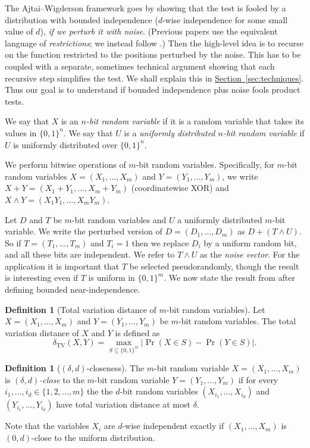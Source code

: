 \documentclass[11pt]{article}
\numberwithin{equation}{section}
\theoremstyle{definition}
\newtheorem{definition}[theorem]{Definition}
\theoremstyle{plain}
\newcommand{\expref}[2]{\hyperref[#2]{#1~\ref{#2}}}
\newcommand{\zo}{\{0,1\}}
\DeclareMathOperator*{\TV}{TV}     %
\begin{document}
The Ajtai--Wigderson framework goes by showing that the test is fooled by
a distribution with 
%
bounded  %
%
%
%
%
independence \cite{NaorN93}
%
($d$-wise independence for some small value of $d$),   %
\emph{if we perturb it with noise}.
%
%
%
%
%
%
%
%
%
%
%
%
%
%
(Previous papers use the equivalent language of
\emph{restrictions}; %
we instead follow \cite{HaramatyLV-bipnfp}.)  Then the
high-level idea is to recurse on the
function restricted to the  %
positions perturbed by the  %
noise.
%
%
%
This has to be coupled with a
separate, sometimes technical argument showing that each
%
recursive step  %
%
simplifies the test. %
%
%
%
We shall explain this
in \expref{Section}{sec:techniques}.  %
Thus our goal is to understand if bounded independence plus noise
%
%
fools product tests.
%
%
%
%
%
%
%
%
%

We say that $X$ is an \emph{$n$-bit random variable} if it is a
random variable that takes its values in $\zo^n$.
We say that $U$ is a \emph{uniformly distributed $n$-bit
random variable} if $U$ is uniformly distributed over $\zo^n$.

%
%
We perform bitwise operations of $m$-bit random variables.
Specifically, for $m$-bit random variables $X=(X_1,\dots,X_m)$ and
$Y=(Y_1,\dots,Y_m)$, we write $X+Y=(X_1+Y_1,\dots,X_m+Y_m)$
(coordinatewise XOR) and $X\wedge Y=(X_1Y_1,\dots,X_mY_m)$.
%
%
%
%

Let $D$ and $T$ be $m$-bit random variables and $U$ a uniformly
distributed $m$-bit variable.  We write the perturbed version
of $D=(D_1,\dots,D_m)$ as $D+(T\wedge U)$.  So if $T=(T_1,\dots,T_m)$
and $T_i=1$ then we replace $D_i$ by a uniform random bit,
and all these bits are independent.  %
We refer to $T\wedge U$ as the \emph{noise vector}.
%
%
%
For the application it is important that $T$
%
be  %
selected pseudorandomly,
though the result is interesting even if $T$ is uniform in $\zo^m$.
We now state the result
%
from  %
\cite{HaramatyLV-bipnfp} after defining 
bounded near-independence.

%
%
%
%
%
%
\begin{definition}[Total variation distance of $m$-bit random variables]
Let $X=(X_1,\ldots,X_m)$ and $Y=(Y_1,\ldots,Y_m)$ be
$m$-bit random variables.  The total variation distance
of $X$ and $Y$ is defined as
\[ \delta_{\TV}(X,Y)= \max_{S\subseteq \zo^m} |\Pr(X\in S) - \Pr(Y\in S)| . \]
%
%
\end{definition}

%
%
\begin{definition}[$(\delta, d)$-closeness] \label{def-almost-independent}
The $m$-bit random variable $X=(X_1, \ldots, X_m)$ is
\emph{$(\delta,d)$-close} to
the $m$-bit random variable %
$Y=(Y_1, \ldots, Y_m)$
%
%
%
%
%
if for every $i_1, \ldots, i_d \in  \{ 1, 2, \ldots, m \}$ the
%
the $d$-bit random variables
$(X_{i_1}, \ldots, X_{i_d})$ and $(Y_{i_1}, \ldots, Y_{i_d})$ have
total variation distance at most $\delta$.
\end{definition}
%
%
%
%
Note that the variables $X_i$ are $d$-wise independent
exactly if $(X_1,\dots,X_m)$ is $(0,d)$-close to the uniform
distribution.
\end{document}
